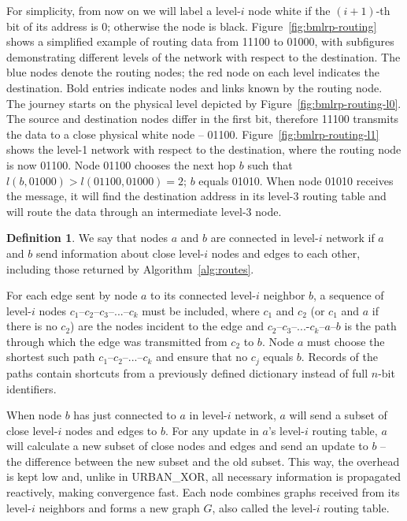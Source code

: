 \documentclass[conference]{IEEEtran}
\theoremstyle{definition}
\newtheorem{defn}{Definition}
\newcommand{\urbanxor}{URBAN\_XOR}
\begin{document}
For simplicity, from now on we will label a level-$i$ node white if the $(i+1)$-th bit of its address is 0; otherwise the node is black. Figure~\ref{fig:bmlrp-routing} shows a simplified example of routing data from 11100 to 01000, with subfigures demonstrating different levels of the network with respect to the destination. The blue nodes denote the routing nodes; the red node on each level indicates the destination. Bold entries indicate nodes and links known by the routing node. The journey starts on the physical level depicted by Figure~\ref{fig:bmlrp-routing-l0}. The source and destination nodes differ in the first bit, therefore 11100 transmits the data to a close physical white node -- 01100. Figure~\ref{fig:bmlrp-routing-l1} shows the level-1 network with respect to the destination, where the routing node is now 01100. Node 01100 chooses the next hop $b$ such that $l(b, 01000) > l(01100, 01000) = 2$; $b$ equals 01010. When node 01010 receives the message, it will find the destination address in its level-3 routing table 
and will route the data through an intermediate level-3 node.

\begin{defn}
    We say that nodes $a$ and $b$ are connected in level-$i$ network if $a$ and $b$ send information about close level-$i$ nodes and edges to each other, including those returned by Algorithm~\ref{alg:routes}.
    
    \label{defn:connected}
\end{defn}

For each edge sent by node $a$ to its connected level-$i$ neighbor $b$, a sequence of level-$i$ nodes $c_1$--$c_2$--$c_3$--...--$c_k$ must be included, where $c_1$ and $c_2$ (or $c_1$ and $a$ if there is no $c_2$) are the nodes incident to the edge and $c_2$--$c_3$--...-$c_k$--$a$--$b$ is the path through which the edge was transmitted from $c_2$ to $b$. Node $a$ must choose the shortest such path $c_1$--$c_2$--...--$c_k$ and ensure that no $c_j$ equals $b$. Records of the paths contain shortcuts from a previously defined dictionary instead of full $n$-bit identifiers.

When node $b$ has just connected to $a$ in level-$i$ network, $a$ will send a subset of close level-$i$ nodes and edges to $b$. For any update in $a$'s level-$i$ routing table, $a$ will calculate a new subset of close nodes and edges and send an update to $b$ -- the difference between the new subset and the old subset. This way, the overhead is kept low and, unlike in \urbanxor, all necessary information is propagated reactively, making convergence fast. Each node combines graphs received from its level-$i$ neighbors and forms a new graph $G$, also called the level-$i$ routing table.
\end{document}
